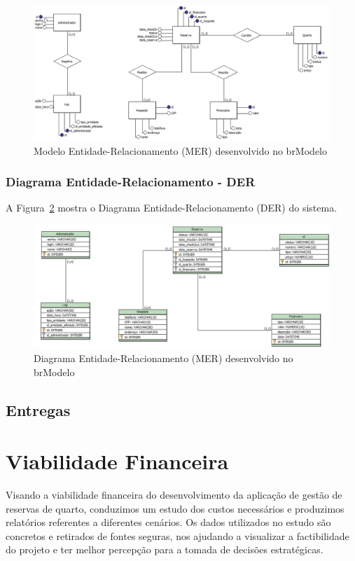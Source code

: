 \documentclass[
	12pt,				%
	openany,			%
	twoside,			%
	a4paper,			%
	english,			%
	french,				%
	spanish,			%
	brazil				%
	]{abntex2}
\begin{document}
\begin{figure}[h!]
	\centering
	\includegraphics[width=\textwidth]{0406-MER.jpg}
	\caption{Modelo Entidade-Relacionamento (MER) desenvolvido no brModelo}
	\label{fig:mer}
\end{figure}
\subsection{Diagrama Entidade-Relacionamento - DER}
A Figura~\ref{fig:der} mostra o Diagrama Entidade-Relacionamento (DER) do sistema.

\begin{figure}[H]
	\centering
	\includegraphics[width=\textwidth]{0406-DER.jpg}
	\caption{Diagrama Entidade-Relacionamento (MER) desenvolvido no brModelo}
	\label{fig:der}
\end{figure}


\section{Entregas}

\chapter{Viabilidade Financeira}
Visando a viabilidade financeira do desenvolvimento da aplicação de gestão de reservas de quarto, conduzimos um estudo dos custos necessários e produzimos relatórios referentes a diferentes cenários. Os dados utilizados no estudo são concretos e retirados de fontes seguras, nos ajudando a visualizar a factibilidade do projeto e ter melhor percepção para a tomada de decisões estratégicas.
\end{document}
